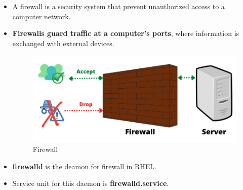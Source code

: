 
\begin{flushleft}
	\begin{itemize}
		\item A firewall is a security system that prevent unauthorized access to a computer network. 
		\item \textbf{Firewalls guard traffic at a computer's ports}, where information is exchanged with external devices.
	
	
	\bigskip
	\bigskip
	\begin{figure}[h!]
		\centering
		\includegraphics[scale=.5]{content/chapter2/images/firewall.png}
		\caption{Firewall}
		\label{fig:firewall}
	\end{figure}

	\bigskip
	
	\item \textbf{firewalld} is the deamon for firewall in RHEL.
	\item Service unit for this daemon is \textbf{firewalld.service}.
	
	\end{itemize}
	
\end{flushleft}

\newpage

